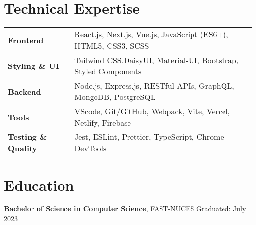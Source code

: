 \documentclass[11pt]{article}
\begin{document}
\section{Technical Expertise}
\begin{tabularx}{\textwidth}{@{} l X @{}}
\textbf{Frontend} & React.js, Next.js, Vue.js, JavaScript (ES6+), HTML5, CSS3, SCSS \\
\textbf{Styling \& UI} & Tailwind CSS,DaisyUI, Material-UI, Bootstrap, Styled Components\\
\textbf{Backend} & Node.js, Express.js, RESTful APIs, GraphQL, MongoDB, PostgreSQL \\
\textbf{Tools} & VScode, Git/GitHub, Webpack, Vite, Vercel, Netlify, Firebase \\
\textbf{Testing \& Quality} & Jest, ESLint, Prettier, TypeScript, Chrome DevTools \\
\end{tabularx}

\section{Education}
\textbf{Bachelor of Science in Computer Science}, FAST-NUCES \hfill Graduated: July 2023 \\

\end{document}

